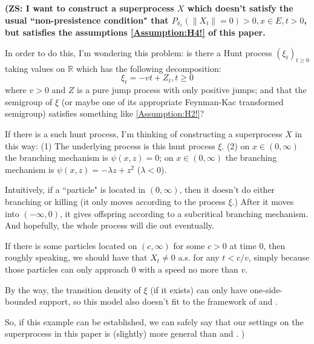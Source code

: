 \documentclass[12pt,a4paper]{amsart}
\numberwithin{equation}{section}
\theoremstyle{plain}
\theoremstyle{definition}
\theoremstyle{remark}
\newcounter{N}
\newcounter{n}[N]
\begin{document}
{\bf (ZS: I want to construct a superprocess $X$ which doesn't satisfy the usual ``non-presistence condition" that $P_{\delta_x}(\|X_t\| = 0)>0, x\in E, t>0$, but satisfies the assumptions \ref{Assumption:H4!} of this paper. 
	
	In order to do this, I'm wondering this problem: is there a Hunt process $(\xi_t)_{t\geq 0}$ taking values on $\mathbb R$ which has the following decomposition:
	\[\xi_t = - vt + Z_t,t\geq 0\]
	 where $v>0$ and $Z$ is a pure jump process with only positive jumps; and that the semigroup of $\xi$ (or maybe one of its appropriate Feynman-Kac transformed semigroup) satisfies something like \ref{Assumption:H2!}? 
	 
	 If there is a such hunt process, I'm thinking of constructing a superprocess $X$ in this way: 
	 (1) The underlying process is this hunt process $\xi$.
	 (2) on $x\in (0,\infty)$ the branching mechanism is $\psi(x,z) = 0$; on $x\in (0,\infty)$ the branching mechanism is $\psi(x,z) = - \lambda z + z^2$ ($\lambda < 0$).
	 
	 Intuitively, if a ``particle" is located in $(0,\infty)$, then it doesn't do either branching or killing (it only moves according to the process $\xi$.) After it moves into $(-\infty, 0)$, it gives offspring according to a subcritical branching mechanism.
	 And hopefully, the whole process will die out eventually. 
	 
	 If there is some particles located on $(c, \infty)$ for some $c>0$ at time $0$, then roughly speaking, we should have that $X_t \neq 0$ a.s. for any $t<c/v$, simply because those particles can only approach $0$ with a speed no more than $v$.
	 
	 By the way, the transition density of $\xi$ (if it exists) can only have one-side-bounded support, so this model also doesn't fit to the framework of \cite{RenSongZhang2015Limit} and \cite{RenSongZhang2017Central}.
	 
	 So, if this example can be established, we can safely say that our settings on the superprocess in this paper is (slightly) more general than \cite{RenSongZhang2015Limit} and \cite{RenSongZhang2017Central}. 
	 )}
\end{document}
